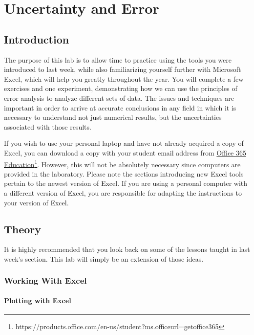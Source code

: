 \chapter{Uncertainty and Error}
\label{chap:excel2}
\section{Introduction}

The purpose of this lab is to allow time to practice using the tools you were introduced to last week, while also familiarizing yourself further with Microsoft Excel, which will help you greatly throughout the year. You will complete a few exercises and one experiment, demonstrating how we can use the principles of error analysis to analyze different sets of data. The issues and techniques are important in order to arrive at accurate conclusions in any field in which it is necessary to understand not just numerical results, but the uncertainties associated with those results. \myskip

If you wish to use your personal laptop and have not already acquired a copy of Excel, you can download a copy with your student email address from
\href{https://products.office.com/en-us/student?ms.officeurl=getoffice365}{Office 365 Education}\footnote{https://products.office.com/en-us/student?ms.officeurl=getoffice365}. However, this will not be absolutely necessary since computers are provided in the laboratory. Please note the sections introducing new Excel tools pertain to the newest version of Excel. If you are using a personal computer with a different version of Excel, you are responsible for adapting the instructions to your version of Excel.

\section{Theory}

It is highly recommended that you look back on some of the lessons taught in last week's section. This lab will simply be an extension of those ideas.

\subsection{Working With Excel}
\subsubsection{Plotting with Excel}

